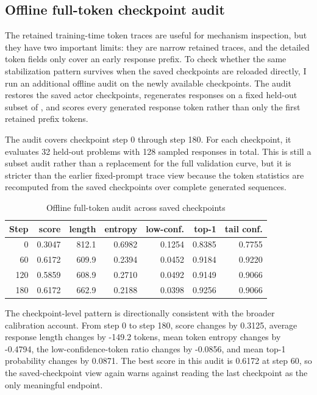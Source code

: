 \subsection{Offline full-token checkpoint audit}

The retained training-time token traces are useful for mechanism inspection, but they have two important limits: they are narrow retained traces, and the detailed token fields only cover an early response prefix. To check whether the same stabilization pattern survives when the saved checkpoints are reloaded directly, I run an additional offline audit on the newly available checkpoints. The audit restores the saved actor checkpoints, regenerates responses on a fixed held-out subset of \EvalSet{}, and scores every generated response token rather than only the first retained prefix tokens.

The audit covers checkpoint step 0 through step 180. For each checkpoint, it evaluates 32 held-out problems with 128 sampled responses in total. This is still a subset audit rather than a replacement for the full validation curve, but it is stricter than the earlier fixed-prompt trace view because the token statistics are recomputed from the saved checkpoints over complete generated sequences.

\begin{table}[H]
    \centering
    \caption{Offline full-token audit across saved checkpoints}
    \label{tab:en-full-token-ckpt-audit}
    \small
    \setlength{\tabcolsep}{4pt}
    \begin{tabular}{rrrrrrr}
        \toprule
        Step & score & length & entropy & low-conf. & top-1 & tail conf. \\
        \midrule
        0 & 0.3047 & 812.1 & 0.6982 & 0.1254 & 0.8385 & 0.7755 \\
        60 & 0.6172 & 609.9 & 0.2394 & 0.0452 & 0.9184 & 0.9220 \\
        120 & 0.5859 & 608.9 & 0.2710 & 0.0492 & 0.9149 & 0.9066 \\
        180 & 0.6172 & 662.9 & 0.2188 & 0.0398 & 0.9256 & 0.9066 \\
        \bottomrule
    \end{tabular}
\end{table}

The checkpoint-level pattern is directionally consistent with the broader calibration account. From step 0 to step 180, score changes by 0.3125, average response length changes by -149.2 tokens, mean token entropy changes by -0.4794, the low-confidence-token ratio changes by -0.0856, and mean top-1 probability changes by 0.0871. The best score in this audit is 0.6172 at step 60, so the saved-checkpoint view again warns against reading the last checkpoint as the only meaningful endpoint.

